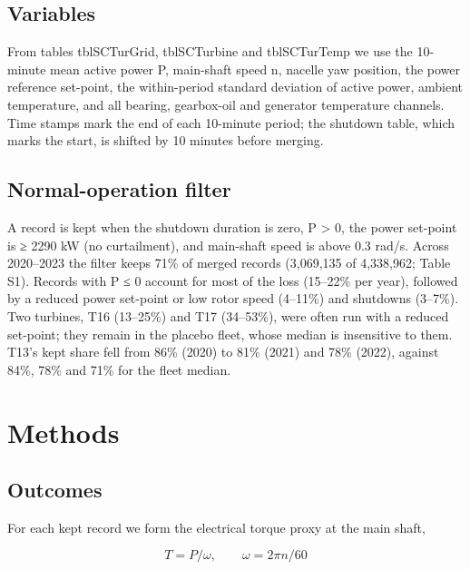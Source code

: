 \documentclass[preprint,12pt]{elsarticle}
\begin{document}
\subsection{Variables}

From tables tblSCTurGrid, tblSCTurbine and tblSCTurTemp we use the 10-minute mean active power P, main-shaft speed n, nacelle yaw position, the power reference set-point, the within-period standard deviation of active power, ambient temperature, and all bearing, gearbox-oil and generator temperature channels. Time stamps mark the end of each 10-minute period; the shutdown table, which marks the start, is shifted by 10 minutes before merging.

\subsection{Normal-operation filter}

A record is kept when the shutdown duration is zero, P \textgreater{} 0, the power set-point is ≥ 2290 kW (no curtailment), and main-shaft speed is above 0.3 rad/s. Across 2020--2023 the filter keeps 71\% of merged records (3,069,135 of 4,338,962; Table S1). Records with P ≤ 0 account for most of the loss (15--22\% per year), followed by a reduced power set-point or low rotor speed (4--11\%) and shutdowns (3--7\%). Two turbines, T16 (13--25\%) and T17 (34--53\%), were often run with a reduced set-point; they remain in the placebo fleet, whose median is insensitive to them. T13's kept share fell from 86\% (2020) to 81\% (2021) and 78\% (2022), against 84\%, 78\% and 71\% for the fleet median.

\section{Methods}

\subsection{Outcomes}

For each kept record we form the electrical torque proxy at the main shaft,

\begin{equation}
T = P/\omega , \qquad \omega = 2\pi n/60
\label{eq:T}
\end{equation}
\end{document}
